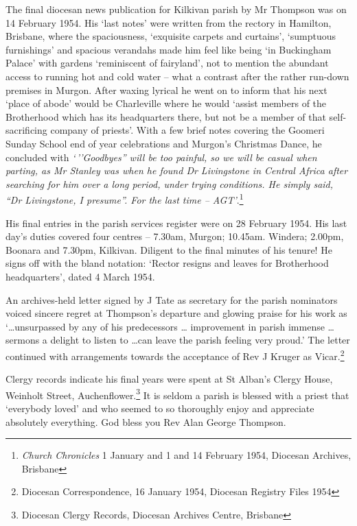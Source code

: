 The final diocesan news publication for Kilkivan parish by Mr Thompson
was on 14 February 1954. His `last notes' were written from the rectory
in Hamilton, Brisbane, where the spaciousness, `exquisite carpets and
curtains', `sumptuous furnishings' and spacious verandahs made him feel
like being `in Buckingham Palace' with gardens `reminiscent of
fairyland', not to mention the abundant access to running hot and cold
water -- what a contrast after the rather run-down premises in Murgon.
After waxing lyrical he went on to inform that his next `place of abode'
would be Charleville where he would `assist members of the Brotherhood
which has its headquarters there, but not be a member of that
self-sacrificing company of priests'. With a few brief notes covering
the Goomeri Sunday School end of year celebrations and Murgon's
Christmas Dance, he concluded with \emph{`\,''Goodbyes'' will be too
painful, so we will be casual when parting, as Mr Stanley was when he
found Dr Livingstone in Central Africa after searching for him over a
long period, under trying conditions. He simply said, ``Dr Livingstone,
I presume''. For the last time -- AGT'}.\footnote{\emph{Church
  Chronicles} 1 January and 1 and 14 February 1954, Diocesan Archives,
  Brisbane}

His final entries in the parish services register were on 28 February
1954. His last day's duties covered four centres -- 7.30am, Murgon;
10.45am. Windera; 2.00pm, Boonara and 7.30pm, Kilkivan. Diligent to the
final minutes of his tenure! He signs off with the bland notation:
`Rector resigns and leaves for Brotherhood headquarters', dated 4 March
1954.

An archives-held letter signed by J Tate as secretary for the parish
nominators voiced sincere regret at Thompson's departure and glowing
praise for his work as `\ldots unsurpassed by any of his predecessors
\ldots{} improvement in parish immense \ldots{} sermons a delight to
listen to \ldots can leave the parish feeling very proud.' The letter
continued with arrangements towards the acceptance of Rev J Kruger as
Vicar.\footnote{Diocesan Correspondence, 16 January 1954, Diocesan
  Registry Files 1954}

Clergy records indicate his final years were spent at St Alban's Clergy
House, Weinholt Street, Auchenflower.\footnote{Diocesan Clergy Records,
  Diocesan Archives Centre, Brisbane} It is seldom a parish is blessed
with a priest that `everybody loved' and who seemed to so thoroughly
enjoy and appreciate absolutely everything. God bless you Rev Alan
George Thompson.

